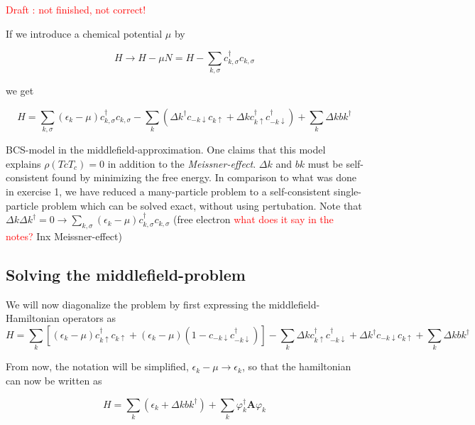 \textcolor{red}{Draft : not finished, not correct!}

If we introduce a chemical potential $\mu$ by 

\begin{equation}
H \rightarrow H - \mu N = H - \sum_{k,\sigma} c_{k,\sigma}^{\dagger} c_{k,\sigma}
\end{equation}

we get 

\begin{equation}
H = \sum_{k,\sigma} (\epsilon_k - \mu)c_{k,\sigma}^{\dagger} c_{k,\sigma} 
- \sum_{k}(\Delta k^{\dagger} c_{-k \downarrow} c_{k \uparrow} +
\Delta k c_{k \uparrow}^{\dagger} c_{-k \downarrow}^{\dagger})
+ \sum_{k}\Delta k b k^{\dagger}
\end{equation}

BCS-model in the middlefield-approximation. One claims that this model explains $\rho(TcT_c) = 0$ in addition to the \textit{Meissner-effect}. 
$\Delta k$ and $bk$ must be self-consistent found by minimizing the free energy. In comparison to what was done in exercise 1, we have reduced a many-particle problem to a self-consistent single-particle problem which can be solved exact, without using pertubation. 
Note that $\Delta k \Delta k^{\dagger} = 0 \rightarrow \sum_{k,\sigma} (\epsilon_k - \mu)c_{k,\sigma}^{\dagger} c_{k,\sigma} $
(free electron \textcolor{red}{ what does it say in the notes?} Inx Meissner-effect)

\subsection*{Solving the middlefield-problem}
We will now diagonalize the problem by first expressing the middlefield-Hamiltonian operators as
\begin{equation}
H = \sum_{k} [ (\epsilon_k - \mu)c_{k \uparrow}^{\dagger} c_{k \uparrow} 
+ (\epsilon_k - \mu) (1-c_{-k \downarrow} c_{-k \downarrow}^{\dagger}) ]
- \sum_{k} \Delta k c_{k \uparrow}^{\dagger} c_{-k \downarrow}^{\dagger} +
\Delta k^{\dagger} c_{-k \downarrow} c_{k \uparrow}
+ \sum_{k}\Delta k b k^{\dagger}
\label{eq:middlefieldH}
\end{equation}

From now, the notation will be simplified, $\epsilon_{k} - \mu \rightarrow \epsilon_k$, so that the hamiltonian can now be written as 

\begin{equation}
H = \sum_{k} (\epsilon_k + \Delta k b k^{\dagger})
+ \sum_{k} \varphi_k^{\dagger} \textbf{A} \varphi_k
\end{equation}


